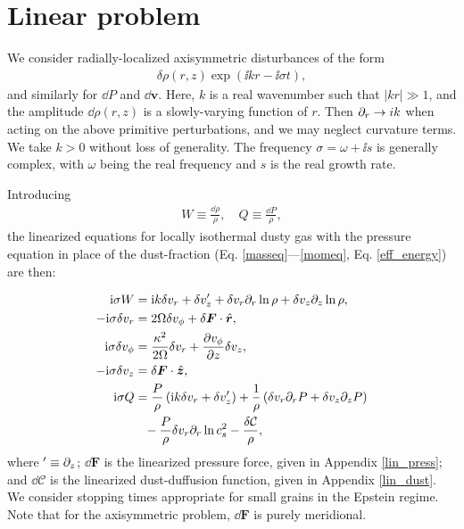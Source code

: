 \section{Linear problem} 
We consider radially-localized axisymmetric disturbances of the form 
\begin{align}
  \delta\rho(r, z)\exp{\left(\ii k r-\ii\sigma t\right)},
\end{align} 
and similarly for $\dd P$ and $\dd\bm{v}$. Here, $k$ is a real
wavenumber such that $|kr|\gg 1$, and the amplitude $\dd\rho(r,z)$ is
a slowly-varying function of $r$. Then 
$\partial_r\to i k$ when acting on the above primitive perturbations, and we may
neglect curvature terms. 
We take  
$k>0$ without loss of  generality. The frequency $\sigma = \omega +
\ii s$ is generally complex, with $\omega$ being the real frequency
and $s$ is the real growth rate. 

Introducing 
\begin{align}
  W \equiv \frac{\dd\rho}{\rho}, \quad Q \equiv \frac{\dd P}{\rho},
\end{align}
the linearized equations for
locally isothermal dusty gas with the pressure equation in place of
the dust-fraction (Eq. \ref{masseq}---\ref{momeq}, Eq. \ref{eff_energy}) are then:   

\begin{align}
  \mathrm{i}\sigma W &= \mathrm{i} k \delta v_r + \delta v_z^\prime +
  \delta v_r \partial_r\ln{\rho} + \delta v_z\partial_z\ln{\rho},\label{lin_mass}\\
  -\mathrm{i}\sigma\delta v_r  &= 2\Omega\delta v_\phi + 
  \delta\bm{F}\cdot\hat{\bm{r}},\label{lin_xmom}\\
  \mathrm{i}\sigma\delta v_\phi &= \frac{\kappa^2}{2\Omega}\delta v_r + \frac{\partial
    v_\phi}{\partial z}\delta v_z, \label{lin_ymom}\\
  -\mathrm{i}\sigma\delta v_z &=  \delta\bm{F}\cdot\hat{\bm{z}},\label{lin_zmom}\\
  \mathrm{i}\sigma Q &= \frac{P}{\rho}\left(\mathrm{i} k \delta v_r + \delta
               v_z^\prime\right) + \frac{1}{\rho}\left(\delta v_r\partial_rP + \delta v_z \partial_zP\right)\notag\\
                &\phantom{=}-\frac{P}{\rho} \delta v_r\partial_r \ln{c_s^2} - \frac{\delta\mathcal{C}}{\rho},\label{lin_energy}
\end{align}  
where $^\prime \equiv \partial_z$; $\dd\bm{F}$ is the linearized pressure force, given in Appendix
\ref{lin_press}; and 
$\dd\mathcal{C}$ is the linearized dust-duffusion function, given in
Appendix \ref{lin_dust}.  We consider stopping times appropriate for
small grains in the Epstein regime. Note that for the axisymmetric
problem, $\dd\bm{F}$ is purely meridional. 


